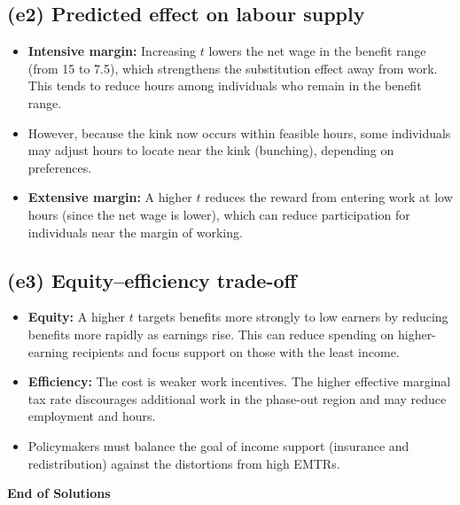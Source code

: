 \documentclass[12pt]{article}
\begin{document}
\subsection*{(e2) Predicted effect on labour supply}

\begin{itemize}
\item \textbf{Intensive margin:} Increasing $t$ lowers the net wage in the benefit range (from 15 to 7.5), which strengthens the substitution effect away from work. This tends to reduce hours among individuals who remain in the benefit range.
\item However, because the kink now occurs within feasible hours, some individuals may adjust hours to locate near the kink (bunching), depending on preferences.
\item \textbf{Extensive margin:} A higher $t$ reduces the reward from entering work at low hours (since the net wage is lower), which can reduce participation for individuals near the margin of working.
\end{itemize}

\subsection*{(e3) Equity--efficiency trade-off}

\begin{itemize}
\item \textbf{Equity:} A higher $t$ targets benefits more strongly to low earners by reducing benefits more rapidly as earnings rise. This can reduce spending on higher-earning recipients and focus support on those with the least income.
\item \textbf{Efficiency:} The cost is weaker work incentives. The higher effective marginal tax rate discourages additional work in the phase-out region and may reduce employment and hours.
\item Policymakers must balance the goal of income support (insurance and redistribution) against the distortions from high EMTRs.
\end{itemize}

\vfill
\textbf{End of Solutions}
\end{document}
